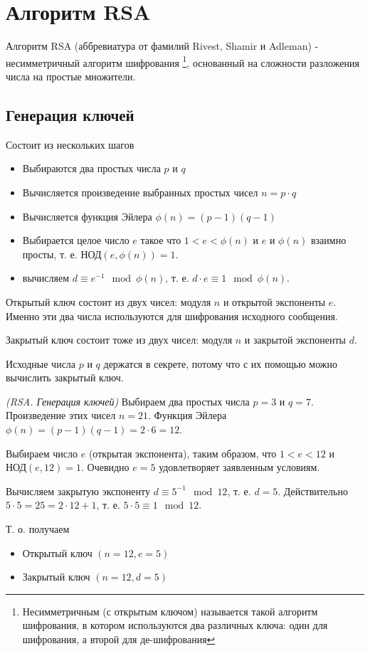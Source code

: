 \section{Алгоритм RSA}
\label{AddRSA}

Алгоритм RSA (аббревиатура от фамилий Rivest, Shamir и Adleman) - 
несимметричный алгоритм шифрования
\footnote{Несимметричным (с открытым ключом) называется такой алгоритм
  шифрования, в 
  котором используются два различных ключа: один для шифрования, а
  второй для де-шифрования},  
основанный на сложности разложения числа на простые множители.  

\subsection{Генерация ключей}

Состоит из нескольких шагов
\begin{itemize}
\item Выбираются два простых числа $p$ и $q$
\item Вычисляется произведение выбранных простых чисел $n = p\cdot q$
\item Вычисляется функция Эйлера 
\(
\phi\left(n\right)=\left(p - 1 \right)\left(q - 1 \right)
\)
\item Выбирается целое число $e$ такое что 
\(
1 < e < \phi\left(n\right)
\) и $e$ и $\phi\left(n\right)$ взаимно просты,
т. е. 
\(
\mbox{НОД}\left( e, \phi\left(n\right) \right) = 1.
\)
\item вычисляем $d \equiv e^{-1} \mod{\phi\left(n\right)}$, т. е.
$d \cdot e \equiv 1 \mod{\phi\left(n\right)}$.
\end{itemize}

Открытый ключ состоит из двух чисел: модуля $n$ и открытой экспоненты
$e$. Именно эти два числа используются для шифрования исходного
сообщения.

Закрытый ключ состоит тоже из двух чисел: модуля $n$ и закрытой экспоненты
$d$.

Исходные числа $p$ и $q$ держатся в секрете, потому что с их помощью
можно вычислить закрытый ключ.

\begin{example}
\emph{(RSA. Генерация ключей)}
Выбираем два простых числа  $p = 3$ и $q = 7$. Произведение этих чисел $n = 21$. Функция Эйлера 
\(
\phi\left(n\right)=\left(p - 1 \right)\left(q - 1 \right) = 2 \cdot 6 = 12
\). 

Выбираем число $e$  (открытая экспонента), таким образом, что $1 < e < 12$ и  
$\mbox{НОД}\left( e, 12 \right) = 1$. Очевидно $e = 5$ удовлетворяет заявленным условиям. 

Вычисляем закрытую экспоненту $d \equiv 5^{-1} \mod{12}$, т. е. $d = 5$. 
Действительно $5 \cdot 5 = 25 = 2 \cdot 12 + 1$, т. е. $5 \cdot 5 \equiv 1 \mod{12}$.

Т. о. получаем
\begin{itemize}
\item Открытый ключ $\left(n=12, e=5\right)$
\item Закрытый ключ $\left(n=12, d=5\right)$
\end{itemize}
\label{exAddRSAKeyGen}
\end{example}

